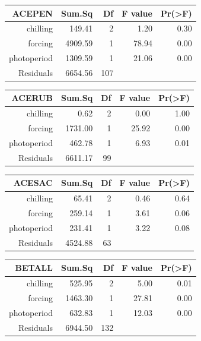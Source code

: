 \documentclass{article}\usepackage[]{graphicx}\usepackage[]{color}
\begin{document}
\begin{table}[ht]
\centering
\begin{tabular}{rrrrr}
  \hline
  ACEPEN & Sum.Sq & Df & F value & Pr(>F) \\
 \hline
chilling & 149.41 &   2 & 1.20 & 0.30 \\ 
  forcing & 4909.59 &   1 & 78.94 & 0.00 \\ 
  photoperiod & 1309.59 &   1 & 21.06 & 0.00 \\ 
  Residuals & 6654.56 & 107 &  &  \\ 
   \hline
\end{tabular}
\end{table}
\begin{table}[ht]
\centering
\begin{tabular}{rrrrr}
  \hline
  ACERUB & Sum.Sq & Df & F value & Pr(>F) \\
 \hline
chilling & 0.62 &   2 & 0.00 & 1.00 \\ 
  forcing & 1731.00 &   1 & 25.92 & 0.00 \\ 
  photoperiod & 462.78 &   1 & 6.93 & 0.01 \\ 
  Residuals & 6611.17 &  99 &  &  \\ 
   \hline
\end{tabular}
\end{table}
\begin{table}[ht]
\centering
\begin{tabular}{rrrrr}
  \hline
  ACESAC & Sum.Sq & Df & F value & Pr(>F) \\
 \hline
chilling & 65.41 &   2 & 0.46 & 0.64 \\ 
  forcing & 259.14 &   1 & 3.61 & 0.06 \\ 
  photoperiod & 231.41 &   1 & 3.22 & 0.08 \\ 
  Residuals & 4524.88 &  63 &  &  \\ 
   \hline
\end{tabular}
\end{table}
\begin{table}[ht]
\centering
\begin{tabular}{rrrrr}
  \hline
  BETALL & Sum.Sq & Df & F value & Pr(>F) \\
 \hline
chilling & 525.95 &   2 & 5.00 & 0.01 \\ 
  forcing & 1463.30 &   1 & 27.81 & 0.00 \\ 
  photoperiod & 632.83 &   1 & 12.03 & 0.00 \\ 
  Residuals & 6944.50 & 132 &  &  \\ 
   \hline
\end{tabular}
\end{table}
\end{document}
